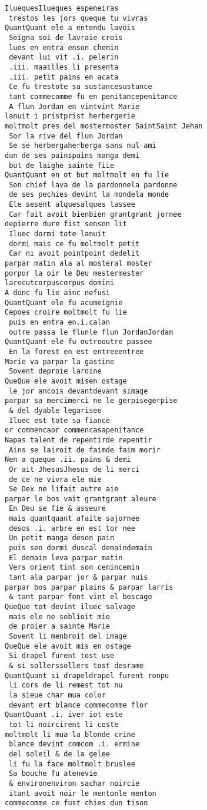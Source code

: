 \documentclass[
  letterpaper,
  DIV=11,
  numbers=noendperiod]{scrreprt}
\begin{document}
\begin{verbatim}
IluequesIlueques espeneiras
 trestos les jors queque tu vivras
QuantQuant ele a entendu lavois
 Seigna soi de lavraie crois
 lues en entra enson chemin
 devant lui vit .i. pelerin
 .iii. maailles li presenta
 .iii. petit pains en acata
 Ce fu trestote sa sustancesustance
 tant commecomme fu en penitancepenitance
 A flun Jordan en vintvint Marie
lanuit i pristprist herbergerie
moltmolt pres del mostermoster SaintSaint Jehan
 Sor la rive del flun Jordan
 Se se herbergaherberga sans nul ami
dun de ses painspains manga demi
 but de laighe sainte fiie
QuantQuant en ot but moltmolt en fu lie
 Son chief lava de la pardonnela pardonne
 de ses pechies devint la mondela monde
 Ele sesent alquesalques lassee
 Car fait avoit bienbien grantgrant jornee
depierre dure fist sonson lit
 Iluec dormi tote lanuit
 dormi mais ce fu moltmolt petit
 Car ni avoit pointpoint dedelit
parpar matin ala al mosteral moster
porpor la oir le Deu mestermester
larecutcorpuscorpus domini
A donc fu lie ainc nefusi
QuantQuant ele fu acumeignie
Cepoes croire moltmolt fu lie
 puis en entra en.i.calan
 outre passa le flunle flun JordanJordan
QuantQuant ele fu outreoutre passee
 En la forest en est entreeentree
Marie va parpar la gastine
 Sovent deproie laroine
QueQue ele avoit misen ostage
 le jor ancois devantdevant simage
parpar sa mercimerci ne le gerpisegerpise
 & del dyable legarisee
 Iluec est tote sa fiance
or commencaor commencasapenitance
Napas talent de repentirde repentir
 Ains se lairoit de faimde faim morir
Nen a queque .ii. pains & demi
 Or ait JhesusJhesus de li merci
 de ce ne vivra ele mie
 Se Dex ne lifait autre aie
parpar le bos vait grantgrant aleure
 En Deu se fie & asseure
 mais quantquant afaite sajornee
 desos .i. arbre en est tor nee
 Un petit manga deson pain
 puis sen dormi duscal demaindemain
 El demain leva parpar matin
 Vers orient tint son cemincemin
 tant ala parpar jor & parpar nuis
parpar bos parpar plains & parpar larris
 & tant parpar font vint el boscage
QueQue tot devint iluec salvage
 mais ele ne soblioit mie
 de proier a sainte Marie
 Sovent li menbroit del image
QueQue ele avoit mis en ostage
 Si drapel furent tost use
 & si sollerssollers tost desrame
QuantQuant si drapeldrapel furent ronpu
 li cors de li remest tot nu
 la sieue char mua color
 devant ert blance commecomme flor
QuantQuant .i. iver iot este
 tot li noircirent li coste
moltmolt li mua la blonde crine
 blance devint comcom .i. ermine
 del soleil & de la gelee
 li fu la face moltmolt bruslee
 Sa bouche fu atenevie
 & environenviron sachar noircie
 itant avoit noir le mentonle menton
commecomme ce fust chies dun tison

\end{verbatim}
\end{document}
